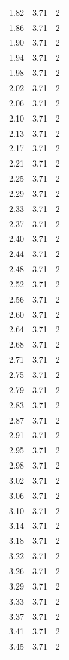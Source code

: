 \begin{longtable}{lrr}
  1.82 & 3.71 & 2 \\
  1.86 & 3.71 & 2 \\
  1.90 & 3.71 & 2 \\
  1.94 & 3.71 & 2 \\
  1.98 & 3.71 & 2 \\
  2.02 & 3.71 & 2 \\
  2.06 & 3.71 & 2 \\
  2.10 & 3.71 & 2 \\
  2.13 & 3.71 & 2 \\
  2.17 & 3.71 & 2 \\
  2.21 & 3.71 & 2 \\
  2.25 & 3.71 & 2 \\
  2.29 & 3.71 & 2 \\
  2.33 & 3.71 & 2 \\
  2.37 & 3.71 & 2 \\
  2.40 & 3.71 & 2 \\
  2.44 & 3.71 & 2 \\
  2.48 & 3.71 & 2 \\
  2.52 & 3.71 & 2 \\
  2.56 & 3.71 & 2 \\
  2.60 & 3.71 & 2 \\
  2.64 & 3.71 & 2 \\
  2.68 & 3.71 & 2 \\
  2.71 & 3.71 & 2 \\
  2.75 & 3.71 & 2 \\
  2.79 & 3.71 & 2 \\
  2.83 & 3.71 & 2 \\
  2.87 & 3.71 & 2 \\
  2.91 & 3.71 & 2 \\
  2.95 & 3.71 & 2 \\
  2.98 & 3.71 & 2 \\
  3.02 & 3.71 & 2 \\
  3.06 & 3.71 & 2 \\
  3.10 & 3.71 & 2 \\
  3.14 & 3.71 & 2 \\
  3.18 & 3.71 & 2 \\
  3.22 & 3.71 & 2 \\
  3.26 & 3.71 & 2 \\
  3.29 & 3.71 & 2 \\
  3.33 & 3.71 & 2 \\
  3.37 & 3.71 & 2 \\
  3.41 & 3.71 & 2 \\
  3.45 & 3.71 & 2 \\

\end{longtable}
